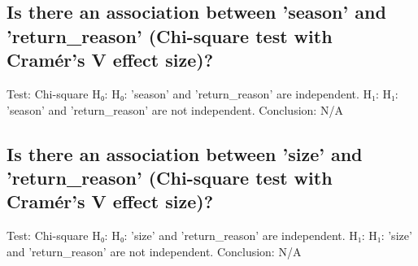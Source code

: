 \documentclass{article}%
\begin{document}
%
\subsection{Is there an association between 'season' and 'return\_reason' (Chi{-}square test with Cramér’s V effect size)?}%
\label{subsec:Isthereanassociationbetweenseasonandreturnreason(Chi{-}squaretestwithCramrsVeffectsize)?}%
Test: Chi{-}square\newline%
H₀: H₀: 'season' and 'return\_reason' are independent.\newline%
H₁: H₁: 'season' and 'return\_reason' are not independent.\newline%
Conclusion: N/A

%
\subsection{Is there an association between 'size' and 'return\_reason' (Chi{-}square test with Cramér’s V effect size)?}%
\label{subsec:Isthereanassociationbetweensizeandreturnreason(Chi{-}squaretestwithCramrsVeffectsize)?}%
Test: Chi{-}square\newline%
H₀: H₀: 'size' and 'return\_reason' are independent.\newline%
H₁: H₁: 'size' and 'return\_reason' are not independent.\newline%
Conclusion: N/A

%
\end{document}
